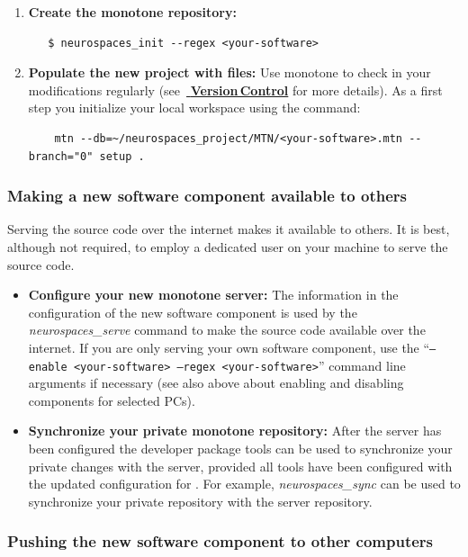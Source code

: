 \documentclass[12pt]{article}
\begin{document}
\begin{enumerate}
\item {\bf Create the monotone repository:}
\begin{verbatim}
   $ neurospaces_init --regex <your-software>
\end{verbatim}

\item {\bf Populate the new project with files:} Use monotone to check
  in your modifications regularly
  (see~\href{../version-control/version-control.tex}{\bf
    Version\,Control} for more details).  As a first step you
  initialize your local workspace using the command:
\begin{verbatim}
    mtn --db=~/neurospaces_project/MTN/<your-software>.mtn --branch="0" setup .
\end{verbatim}

\end{enumerate}

\subsubsection*{Making a new software component available to others}

Serving the source code over the internet makes it available to
others.  It is best, although not required, to employ a dedicated user on
your machine to serve the source code.

\begin{itemize}
\item {\bf Configure your new monotone server:} The information in the
  configuration of the new software component is used by the {\it
    neurospaces\_serve} command to make the source code available over
  the internet.  If you are only serving your own software component,
  use the ``{\tt --enable <your-software> --regex <your-software>}''
  command line arguments if necessary (see also above about enabling
  and disabling components for selected PCs).
  
\item {\bf Synchronize your private monotone repository:} After the
  server has been configured the developer package tools can be used to
  synchronize your private changes with the server, provided all tools
  have been configured with the updated configuration for
  {\tt <your-software>}.  For example, {\it neurospaces\_sync} can be used
  to synchronize your private repository with the server repository.
\end{itemize}
  
\subsubsection*{Pushing the new software component to other computers}
\end{document}
